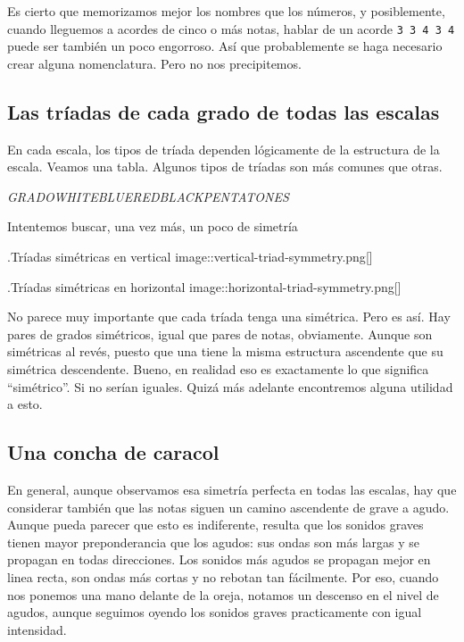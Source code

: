 \documentclass[]{article}
\begin{document}
Es cierto que memorizamos mejor los nombres que los números, y posiblemente, cuando lleguemos a acordes de cinco o más notas, hablar de un acorde \texttt{3\ 3\ 4\ 3\ 4} puede ser también un poco engorroso. Así que probablemente se haga necesario crear alguna nomenclatura. Pero no nos precipitemos.

\subsection{Las tríadas de cada grado de todas las escalas}

En cada escala, los tipos de tríada dependen lógicamente de la estructura de la escala. Veamos una tabla. Algunos tipos de tríadas son más comunes que otras.

\emph{GRADO}\emph{WHITE}\emph{BLUE}\emph{RED}\emph{BLACK}\emph{PENTA}\emph{TONES}

Intentemos buscar, una vez más, un poco de simetría

.Tríadas simétricas en vertical image::vertical-triad-symmetry.png{[}{]}

.Tríadas simétricas en horizontal image::horizontal-triad-symmetry.png{[}{]}

No parece muy importante que cada tríada tenga una simétrica. Pero es así. Hay pares de grados simétricos, igual que pares de notas, obviamente. Aunque son simétricas al revés, puesto que una tiene la misma estructura ascendente que su simétrica descendente. Bueno, en realidad eso es exactamente lo que significa ``simétrico''. Si no serían iguales. Quizá más adelante encontremos alguna utilidad a esto.

\subsection{Una concha de caracol}

En general, aunque observamos esa simetría perfecta en todas las escalas, hay que considerar también que las notas siguen un camino ascendente de grave a agudo. Aunque pueda parecer que esto es indiferente, resulta que los sonidos graves tienen mayor preponderancia que los agudos: sus ondas son más largas y se propagan en todas direcciones. Los sonidos más agudos se propagan mejor en linea recta, son ondas más cortas y no rebotan tan fácilmente. Por eso, cuando nos ponemos una mano delante de la oreja, notamos un descenso en el nivel de agudos, aunque seguimos oyendo los sonidos graves practicamente con igual intensidad.
\end{document}
